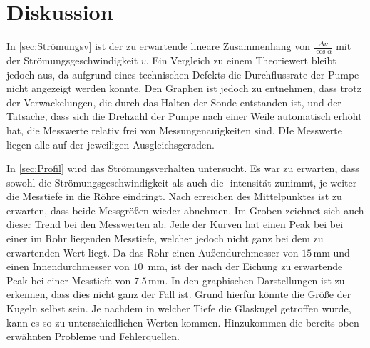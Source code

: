 \section{Diskussion}
\label{sec:Diskussion}

In \autoref{sec:Strömungsv} ist der zu erwartende lineare Zusammenhang von $\frac{\Delta \nu}{\cos \alpha}$ mit der Strömungsgeschwindigkeit $v$. Ein Vergleich zu einem Theoriewert bleibt jedoch aus, 
da aufgrund eines technischen Defekts die Durchflussrate der Pumpe nicht angezeigt werden konnte. Den Graphen ist jedoch zu entnehmen, dass trotz der Verwackelungen, die durch das Halten der Sonde entstanden ist, und 
der Tatsache, dass sich die Drehzahl der Pumpe nach einer Weile automatisch erhöht hat, die Messwerte relativ frei von Messungenauigkeiten sind. DIe Messwerte liegen alle auf der jeweiligen Ausgleichsgeraden.

In \autoref{sec:Profil} wird das Strömungsverhalten untersucht. Es war zu erwarten, dass sowohl die Strömungsgeschwindigkeit als auch die -intensität zunimmt, je weiter die Messtiefe in die Röhre eindringt.
Nach erreichen des Mittelpunktes ist zu erwarten, dass beide Messgrößen wieder abnehmen. Im Groben zeichnet sich auch dieser Trend bei den Messwerten ab. Jede der Kurven hat einen Peak bei bei einer im Rohr liegenden Messtiefe, welcher jedoch nicht ganz bei dem zu erwartenden Wert liegt.
Da das Rohr einen Außendurchmesser von $15\,$mm und einen Innendurchmesser von $10\,$ mm, ist der nach der Eichung zu erwartende Peak bei einer Messtiefe von $7.5\,$mm.
In den graphischen Darstellungen ist zu erkennen, dass dies nicht ganz der Fall ist. Grund hierfür könnte die Größe der Kugeln selbst sein. Je nachdem in welcher Tiefe die Glaskugel getroffen wurde, kann es so zu unterschiedlichen Werten kommen. 
Hinzukommen die bereits oben erwähnten Probleme und Fehlerquellen.
